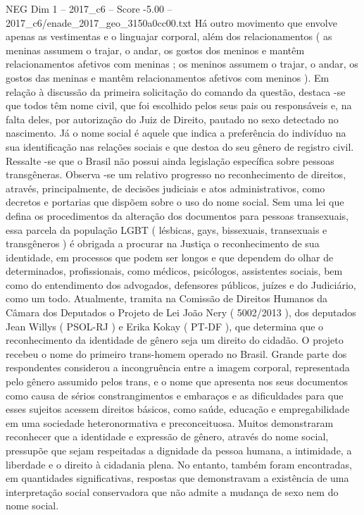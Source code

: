 \begin{textsample}{NEG Dim 1 – 2017\_c6 – Score -5.00 – 2017\_c6/enade\_2017\_geo\_3150a0cc00.txt}
Há outro movimento que envolve apenas as vestimentas e o linguajar corporal, além dos relacionamentos ( as meninas assumem o trajar, o andar, os gostos dos meninos e mantêm relacionamentos afetivos com meninas ; os meninos assumem o trajar, o andar, os gostos das meninas e mantêm relacionamentos afetivos com meninos ).
Em relação à discussão da primeira solicitação do comando da questão, destaca -se que todos têm nome civil, que foi escolhido pelos seus pais ou responsáveis e, na falta deles, por autorização do Juiz de Direito, pautado no sexo detectado no nascimento.
Já o nome social é aquele que indica a preferência do indivíduo na sua identificação nas relações sociais e que destoa do seu gênero de registro civil.
Ressalte -se que o Brasil não possui ainda legislação específica sobre pessoas transgêneras.
Observa -se um relativo progresso no reconhecimento de direitos, através, principalmente, de decisões judiciais e atos administrativos, como decretos e portarias que dispõem sobre o uso do nome social.
Sem uma lei que defina os procedimentos da alteração dos documentos para pessoas transexuais, essa parcela da população LGBT ( lésbicas, gays, bissexuais, transexuais e transgêneros ) é obrigada a procurar na Justiça o reconhecimento de sua identidade, em processos que podem ser longos e que dependem do olhar de determinados, profissionais, como médicos, psicólogos, assistentes sociais, bem como do entendimento dos advogados, defensores públicos, juízes e do Judiciário, como um todo.
Atualmente, tramita na Comissão de Direitos Humanos da Câmara dos Deputados o Projeto de Lei João Nery ( 5002/2013 ), dos deputados Jean Willys ( PSOL-RJ ) e Erika Kokay ( PT-DF ), que determina que o reconhecimento da identidade de gênero seja um direito do cidadão.
O projeto recebeu o nome do primeiro trans-homem operado no Brasil.
Grande parte dos respondentes considerou a incongruência entre a imagem corporal, representada pelo gênero assumido pelos trans, e o nome que apresenta nos seus documentos como causa de sérios constrangimentos e embaraços e as dificuldades para que esses sujeitos acessem direitos básicos, como saúde, educação e empregabilidade em uma sociedade heteronormativa e preconceituosa.
Muitos demonstraram reconhecer que a identidade e expressão de gênero, através do nome social, pressupõe que sejam respeitadas a dignidade da pessoa humana, a intimidade, a liberdade e o direito à cidadania plena.
No entanto, também foram encontradas, em quantidades significativas, respostas que demonstravam a existência de uma interpretação social conservadora que não admite a mudança de sexo nem do nome social.

\end{textsample}
